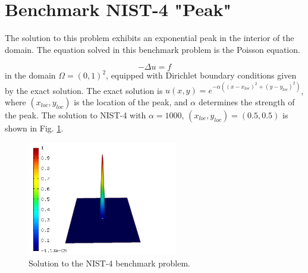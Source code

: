 \documentclass[12pt]{elsarticle}
\begin{document}

\section{Benchmark NIST-4 "Peak"}
\label{sec:bench-4}

The solution to this problem exhibits an exponential peak in the interior of the domain.
The equation solved in this benchmark problem is the Poisson equation.

\begin{equation} \label{poisson-peak}
-\Delta u = f
\end{equation}
in the domain $\Omega = (0, 1)^2$, equipped with Dirichlet
boundary conditions given by the exact solution.
The exact solution is
$u(x,y) = e^{-\alpha ((x - x_{loc})^{2} + (y - y_{loc})^{2})}$,
where $(x_{loc}, y_{loc})$ is the location of the peak,
and $\alpha$ determines the strength of the peak.
The solution to NIST-4 with $\alpha = 1000$,
$(x_{loc}, y_{loc}) = (0.5, 0.5)$ is shown in Fig. \ref{fig:sln-nist04}.

\begin{figure}[H]
\centering
\includegraphics[height=5cm]{nist/nist-4/solution.png}
\caption{Solution to the NIST-4 benchmark problem.}
\vspace{-3mm}
\label{fig:sln-nist04}
\end{figure}

\end{document}
